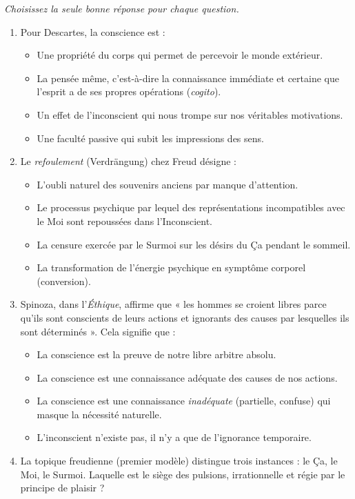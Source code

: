 \documentclass[11pt]{article}
\begin{document}
\begin{exercice}
\emph{Choisissez la seule bonne réponse pour chaque question.}
\begin{enumerate}
\item Pour Descartes, la conscience est :
\begin{itemize}
\item[A.] Une propriété du corps qui permet de percevoir le monde extérieur.
\item[B.] La pensée même, c'est-à-dire la connaissance immédiate et certaine que l'esprit a de ses propres opérations (\emph{cogito}).
\item[C.] Un effet de l'inconscient qui nous trompe sur nos véritables motivations.
\item[D.] Une faculté passive qui subit les impressions des sens.
\end{itemize}
\item Le \emph{refoulement} (Verdrängung) chez Freud désigne :
\begin{itemize}
\item[A.] L'oubli naturel des souvenirs anciens par manque d'attention.
\item[B.] Le processus psychique par lequel des représentations incompatibles avec le Moi sont repoussées dans l'Inconscient.
\item[C.] La censure exercée par le Surmoi sur les désirs du Ça pendant le sommeil.
\item[D.] La transformation de l'énergie psychique en symptôme corporel (conversion).
\end{itemize}
\item Spinoza, dans l'\emph{Éthique}, affirme que « les hommes se croient libres parce qu'ils sont conscients de leurs actions et ignorants des causes par lesquelles ils sont déterminés ». Cela signifie que :
\begin{itemize}
\item[A.] La conscience est la preuve de notre libre arbitre absolu.
\item[B.] La conscience est une connaissance adéquate des causes de nos actions.
\item[C.] La conscience est une connaissance \emph{inadéquate} (partielle, confuse) qui masque la nécessité naturelle.
\item[D.] L'inconscient n'existe pas, il n'y a que de l'ignorance temporaire.
\end{itemize}
\item La topique freudienne (premier modèle) distingue trois instances : le Ça, le Moi, le Surmoi. Laquelle est le siège des pulsions, irrationnelle et régie par le principe de plaisir ?

\end{enumerate}
\end{exercice}
\end{document}
